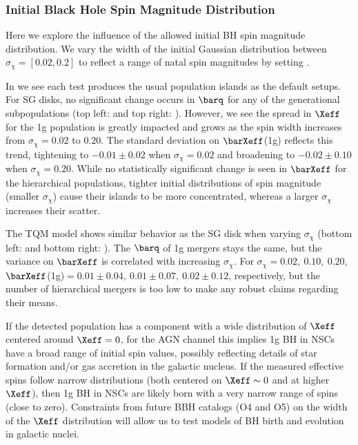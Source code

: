 \subsubsection{Initial Black Hole Spin Magnitude Distribution}
Here we explore the influence of the allowed initial BH spin magnitude distribution.
We vary the width of the initial Gaussian distribution between $\sigma_\chi=[0.02,0.2]$ to reflect a range of natal spin magnitudes by setting .

In  we see each test produces the usual population islands as the default setups.
For SG disks, no significant change occurs in $\barq$ for any of the generational subpopulations (top left:  and top right: ).
However, we see the spread in $\Xeff$ for the 1g population is greatly impacted and grows as the spin width increases from $\sigma_\chi= 0.02$ to $0.20$.
The standard deviation on $\barXeff$(1g) reflects this trend, tightening to $-0.01\pm0.02$ when $\sigma_\chi = 0.02$ and broadening to $-0.02\pm0.10$ when $\sigma_\chi = 0.20$.
While no statistically significant change is seen in $\barXeff$ for the hierarchical populations, tighter initial distributions of spin magnitude (smaller $\sigma_\chi$) cause their islands to be more concentrated, whereas a larger $\sigma_\chi$ increases their scatter.

The TQM model shows similar behavior as the SG disk when varying $\sigma_\chi$ (bottom left:  and bottom right: ).
The $\barq$ of 1g mergers stays the same, but the variance on $\barXeff$ is correlated with increasing $\sigma_\chi$.
For $\sigma_\chi=0.02,\ 0.10,\ 0.20$, $\barXeff$(1g)$=0.01\pm0.04,\ 0.01\pm0.07,\ 0.02\pm0.12$, respectively, but the number of hierarchical mergers is too low to make any robust claims regarding their means.

If the detected population has a component with a wide distribution of $\Xeff$ centered around $\Xeff=0$, for the AGN channel this implies 1g BH in NSCs have a broad range of initial spin values, possibly reflecting details of star formation and/or gas accretion in the galactic nucleus.
If the measured effective spins follow narrow distributions (both centered on $\Xeff \sim 0$ and at higher $\Xeff$), then 1g BH in NSCs are likely born with a very narrow range of spins (close to zero).
Constraints from future BBH catalogs (O4 and O5) on the width of the $\Xeff$ distribution will allow us to test models of BH birth and evolution in galactic nuclei.

